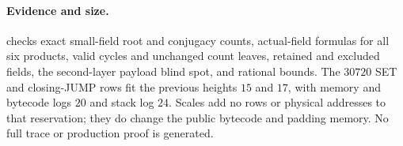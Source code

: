 \paragraph{Evidence and size.}  checks exact small-field root and conjugacy counts, actual-field formulas for all six products, valid cycles and unchanged count leaves, retained and excluded fields, the second-layer payload blind spot, and rational bounds. The $30720$ SET and closing-JUMP rows fit the previous heights $15$ and $17$, with memory and bytecode logs $20$ and stack log $24$. Scales add no rows or physical addresses to that reservation; they do change the public bytecode and padding memory. No full trace or production proof is generated.
